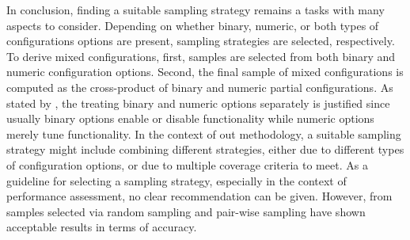 In conclusion, finding a suitable sampling strategy remains a tasks with many
aspects to consider. Depending on whether binary, numeric, or both types of
configurations options are present, sampling strategies are selected,
respectively. To derive mixed configurations, first, samples are selected from
both binary and numeric configuration options. Second, the final sample of
mixed configurations is computed as the cross-product of binary and numeric
partial configurations. As stated by \cite{siegmund_performance-influence_2015}, the
treating binary and numeric options separately is justified since usually binary options enable
or disable functionality while numeric options merely tune functionality. In
the context of out methodology, a suitable sampling strategy might include
combining different strategies, either due to different types of configuration
options, or due to multiple coverage criteria to meet. As a guideline for
selecting a sampling strategy, especially in the context of performance
assessment, no clear recommendation can be given. However, from samples
selected via random sampling \citep{sarkar_cost-efficient_2015} and pair-wise
sampling \citep{siegmund_performance-influence_2015} have shown acceptable results in terms
of accuracy.
